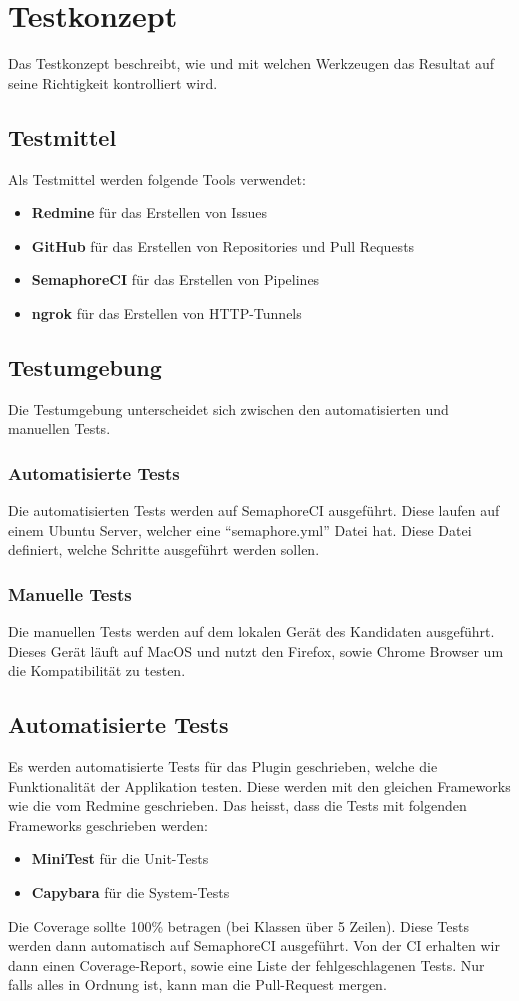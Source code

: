 \section{Testkonzept}
\label{sec:testkonzept}
Das Testkonzept beschreibt, wie und mit welchen Werkzeugen das Resultat auf seine Richtigkeit kontrolliert wird.

\subsection{Testmittel}
Als Testmittel werden folgende Tools verwendet:
\begin{itemize}
  \item \textbf{Redmine} für das Erstellen von Issues
  \item \textbf{GitHub} für das Erstellen von Repositories und Pull Requests
  \item \textbf{SemaphoreCI} für das Erstellen von Pipelines
  \item \textbf{ngrok} für das Erstellen von HTTP-Tunnels
\end{itemize}

\subsection{Testumgebung}
Die Testumgebung unterscheidet sich zwischen den automatisierten und manuellen Tests.
\subsubsection{Automatisierte Tests}
Die automatisierten Tests werden auf SemaphoreCI ausgeführt. Diese laufen auf einem Ubuntu Server, welcher eine
\enquote{semaphore.yml} Datei hat. Diese Datei definiert, welche Schritte ausgeführt werden sollen.
\subsubsection{Manuelle Tests}
Die manuellen Tests werden auf dem lokalen Gerät des Kandidaten ausgeführt. Dieses Gerät läuft auf MacOS und nutzt
den Firefox, sowie Chrome Browser um die Kompatibilität zu testen.

\subsection{Automatisierte Tests}
Es werden automatisierte Tests für das Plugin geschrieben, welche die Funktionalität der Applikation testen.
Diese werden mit den gleichen Frameworks wie die vom Redmine geschrieben. Das heisst, dass die Tests mit
folgenden Frameworks geschrieben werden:
\begin{itemize}
  \item \textbf{MiniTest} für die Unit-Tests
  \item \textbf{Capybara} für die System-Tests
\end{itemize}
Die Coverage sollte 100\% betragen (bei Klassen über 5 Zeilen). Diese Tests werden dann automatisch auf 
SemaphoreCI ausgeführt. Von der CI erhalten wir dann einen Coverage-Report, sowie eine Liste der
fehlgeschlagenen Tests. Nur falls alles in Ordnung ist, kann man die Pull-Request mergen.


